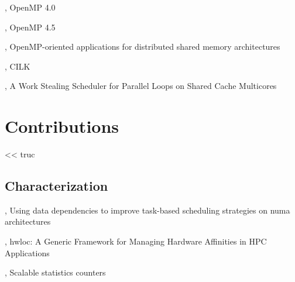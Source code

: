 




\cite{openmp40}, OpenMP 4.0

\cite{openmp45}, OpenMP 4.5

\cite{Marowka2004}, OpenMP-oriented applications for distributed shared memory architectures

\cite{cilk5}, CILK

\cite{Tchiboukdjian2010}, A Work Stealing Scheduler for Parallel Loops on Shared Cache Multicores





\part{Contributions}

\begin{savequote}[6cm]
<< truc
\end{savequote}

\chapter{Characterization}\label{chap:contrib:characterization}
\chaptertoc


%
\cite{Virouleau2016b}, Using data dependencies to improve task-based scheduling strategies on numa architectures

\cite{Broquedis2010}, hwloc: {A} Generic Framework for Managing Hardware Affinities in {HPC} Applications


\cite{Dice2013}, Scalable statistics counters

